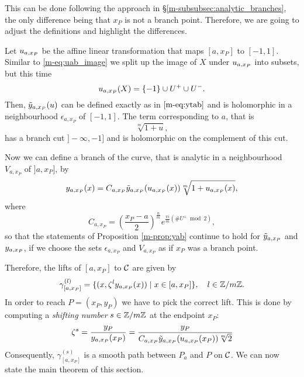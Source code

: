\documentclass[main.tex]{subfiles}
\begin{document}
  This can be done following the approach in \S \ref{m-subsubsec:analytic_branches}, the only difference being that
  $x_P$ is not a branch point. Therefore, we are going to adjust the definitions and highlight the differences.

  Let  $u_{a,x_P}$ be the affine linear transformation
  that maps $[a,x_P]$ to $[-1,1]$.
  Similar to \eqref{m-eq:uab_image} we split up the image of $X$ under $u_{a,x_P}$ into subsets,
  but this time
 \begin{equation*}
  u_{a,x_P}(X) = \{-1\} \cup U^+ \cup U^-.
 \end{equation*}
  Then, $\tilde{y}_{a,x_P}(u)$ can be defined exactly as in $\eqref{m-eq:ytab}$ and
  is holomorphic in a neighbourhood $\epsilon_{a,x_P}$ of $[-1,1]$.
  The term corresponding to $a$, that is
  \begin{equation*}
   \sqrt[m]{1+u},
  \end{equation*}
   has a branch cut $]-\infty,-1]$ and is holomorphic on the complement of this cut.

  Now we can define a branch of the curve,
   that is analytic in a neighbourhood $V_{a,x_P}$ of $]a,x_P]$, by
  \begin{equation*}
    y_{a,x_P}(x) =   C_{a,x_P} \tilde{y}_{a,x_P}( u_{a,x_P}(x) ) \sqrt[m]{1 + u_{a,x_P}(x)},
  \end{equation*}
  where
   \begin{equation*}
      C_{a,x_P} = \left(\frac{x_P-a}{2}\right)^{\frac{n}{m}} e^{\frac{\pi i}{m}(\#U^+ \bmod 2)},
  \end{equation*}
  so that the statements of Proposition \ref{m-prop:yab} continue to hold for $\tilde{y}_{a,x_P}$ and $y_{a,x_P}$,
  if we choose the sets $\epsilon_{a,x_P}$ and $V_{a,x_P}$ as if $x_P$ was a branch point.

  Therefore, the lifts of $[a,x_P]$ to $\mathcal{C}$ are given by
    \begin{equation*}\label{eq:def_path_axp}
      \gamma^{(l)}_{[a,x_P]} = \{  (x,\zeta^l y_{a,x_P}(x))  \mid  x \in [a,x_P]  \}, \quad l \in \mathbb{Z}/m\mathbb{Z}.
   \end{equation*}
  In order to reach $P = (x_P,y_P)$ we have to pick the correct lift. This is done by computing a \emph{shifting number} $s \in \mathbb{Z}/m\mathbb{Z}$ at the endpoint $x_P$:
  \begin{equation*}
      \label{eq:saj}
   \zeta^s = \frac{y_P}{y_{a,x_P}(x_P)} = \frac{y_P}{ C_{a,x_P} \tilde{y}_{a,x_P}( u_{a,x_P}(x_P) ) \sqrt[m]{2}  }
  \end{equation*}
  Consequently, $\gamma^{(s)}_{[a,x_P]}$ is a smooth path between $P_a$ and $P$ on $\mathcal{C}$. We can now state the main theorem of this section.
\end{document}
